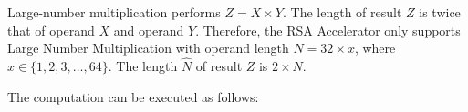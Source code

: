 \documentclass[main\_\_EN.tex]{subfiles}
\begin{document}
Large-number multiplication performs \begin{math}Z = X \times Y\end{math}. The length of result \begin{math}Z\end{math} is twice that of operand \begin{math}X\end{math} and operand \begin{math}Y\end{math}. Therefore, the RSA Accelerator only supports Large Number Multiplication with operand length \begin{math}N = 32 \times x\end{math}, where \begin{math}x \in \{ 1, 2, 3, \dots, 64\}\end{math}. The length \begin{math}\hat{N}\end{math} of result \begin{math}Z\end{math} is \begin{math}2 \times N\end{math}.

The computation can be executed as follows:
\end{document}
